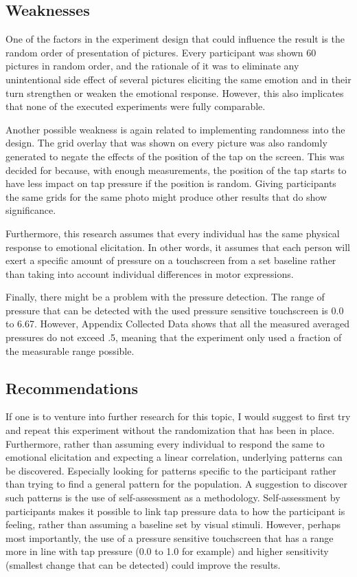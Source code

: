 \documentclass{sigchi}
\begin{document}
\subsection{Weaknesses}
One of the factors in the experiment design that could influence the result is the random order of presentation of pictures. Every participant was shown 60 pictures in random order, and the rationale of it was to eliminate any unintentional side effect of several pictures eliciting the same emotion and in their turn strengthen or weaken the emotional response. However, this also implicates that none of the executed experiments were fully comparable.

Another possible weakness is again related to implementing randomness into the design. The grid overlay that was shown on every picture was also randomly generated to negate the effects of the position of the tap on the screen. This was decided for because, with enough measurements, the position of the tap starts to have less impact on tap pressure if the position is random. Giving participants the same grids for the same photo might produce other results that do show significance.

Furthermore, this research assumes that every individual has the same physical response to emotional elicitation. In other words, it assumes that each person will exert a specific amount of pressure on a touchscreen from a set baseline rather than taking into account individual differences in motor expressions.

Finally, there might be a problem with the pressure detection. The range of pressure that can be detected with the used pressure sensitive touchscreen is 0.0 to 6.67. However, Appendix Collected Data shows that all the measured averaged pressures do not exceed .5, meaning that the experiment only used a fraction of the measurable range possible.

\subsection{Recommendations} %
\label{sub:recommendations}
If one is to venture into further research for this topic, I would suggest to first try and repeat this experiment without the randomization that has been in place. Furthermore, rather than assuming every individual to respond the same to emotional elicitation and expecting a linear correlation, underlying patterns can be discovered. Especially looking for patterns specific to the participant rather than trying to find a general pattern for the population. A suggestion to discover such patterns is the use of self-assessment as a methodology. Self-assessment by participants makes it possible to link tap pressure data to how the participant is feeling, rather than assuming a baseline set by visual stimuli. However, perhaps most importantly, the use of a pressure sensitive touchscreen that has a range more in line with tap pressure (0.0 to 1.0 for example) and higher sensitivity (smallest change that can be detected) could improve the results.
\end{document}
